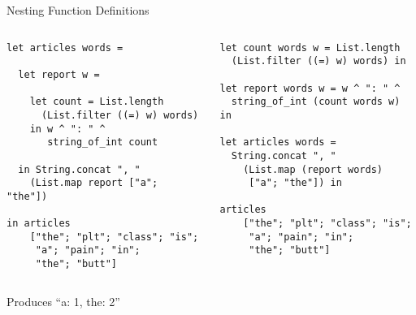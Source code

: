 \documentclass{plt}
\begin{document}
\begin{frame}[fragile]{Nesting Function Definitions}

\begin{columns}
  \begin{column}{0.5\textwidth}
\shadowstart
\begin{lstlisting}[language=caml,morendkeywords={words},ndkeywordstyle={\itshape\color{red}}]
let articles words =

  let report w =

    let count = List.length
      (List.filter ((=) w) words)
    in w ^ ": " ^
       string_of_int count

  in String.concat ", "
    (List.map report ["a"; "the"])

in articles
    ["the"; "plt"; "class"; "is";
     "a"; "pain"; "in";
     "the"; "butt"]
\end{lstlisting}
\shadowend
  \end{column}
  \begin{column}{0.5\textwidth}
\shadowstart
\begin{lstlisting}[language=caml,morendkeywords={words},ndkeywordstyle={\itshape\color{red}}]
let count words w = List.length
  (List.filter ((=) w) words) in

let report words w = w ^ ": " ^
  string_of_int (count words w) in

let articles words =
  String.concat ", "
    (List.map (report words)
     ["a"; "the"]) in

articles
    ["the"; "plt"; "class"; "is";
     "a"; "pain"; "in";
     "the"; "butt"]
\end{lstlisting}
\shadowend
  \end{column}
\end{columns}

Produces ``a: 1, the: 2''

\end{frame}

\def\stackframe#1#2{
 \node [frame] (#1) {(access link)\\#2}
    node [fill,circle,inner sep=1pt] at ($(#1.north east) + (-6pt,-6pt)$)
      (#1-sl) {}
    node [anchor=east] at (#1.west) {#1:};
}

\def\link#1#2{
  \draw [->] (#1-sl) to [out=45,in=-15] ($(#2.north east) + (0,-6pt)$);
}
\end{document}
